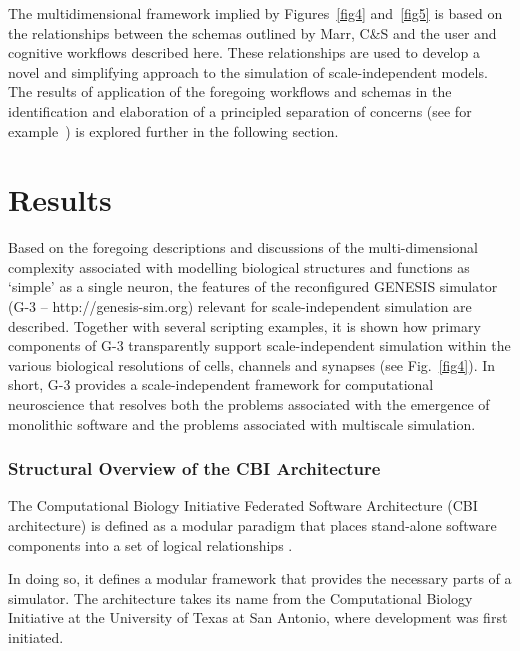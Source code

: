 \documentclass[10pt,letterpaper]{article}
\begin{document}
The multidimensional framework implied by Figures~\ref{fig4} and~\ref{fig5} is based on the relationships between the schemas outlined by Marr, C\&S and the user and cognitive workflows described here. These relationships are used to develop a novel and simplifying approach to the simulation of scale-independent models. The results of application of the foregoing workflows and schemas in the identification and elaboration of a principled separation of concerns (see for example~\cite{Dijkstra:1982fu}) is explored further in the following section.

\section*{Results}

Based on the foregoing descriptions and discussions of the multi-dimensional complexity associated with modelling biological structures and functions as ‘simple’ as a single neuron, the features of the reconfigured GENESIS simulator (G-3 -- http://genesis-sim.org) relevant for scale-independent simulation are described.  Together with several scripting examples, it is shown how primary components of G-3 transparently support scale-independent simulation within the various biological resolutions of cells, channels and synapses (see Fig.~\ref{fig4}). In short, G-3 provides a scale-independent framework for computational neuroscience that resolves both the problems associated with the emergence of monolithic software and the problems associated with multiscale simulation.

\subsubsection*{Structural Overview of the CBI Architecture}

The Computational Biology Initiative Federated Software Architecture (CBI architecture) is defined as a modular paradigm that places stand-alone software components into a set of logical relationships \cite{cornelis12}.

In doing so, it defines a modular framework that provides the
necessary parts of a simulator. The architecture takes its name from the Computational Biology Initiative at the University of Texas at San Antonio, where development was first initiated.
\end{document}

